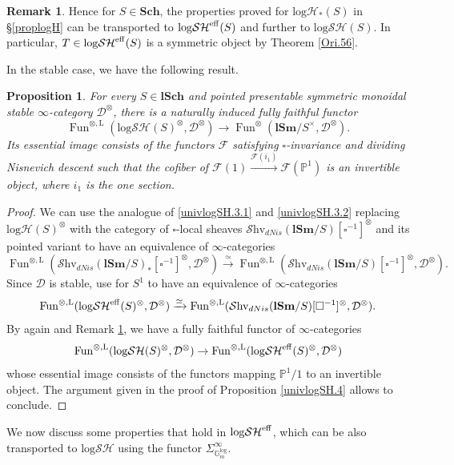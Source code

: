 \documentclass[11pt, a4paper]{amsart}
\newtheorem{prop}[thm]{Proposition}
\theoremstyle{definition}
\newtheorem{rmk}[thm]{Remark}
\numberwithin{equation}{subsection}
\renewcommand{\P}{\mathbb{P}}
\newcommand{\Sch}{\mathbf{Sch}}
\newcommand{\lSch}{\mathbf{lSch}}
\newcommand{\lSm}{\mathbf{lSm}}
\newcommand{\cD}{\mathcal{D}}
\newcommand{\cF}{\mathcal{F}}
\newcommand{\boxx}{\square}
\newcommand{\Gmm}{\mathbb{G}_m^{\mathrm{log}}}
\newcommand{\eff}{{\rm eff}}
\newcommand{\infShv}{\mathcal{S}\mathrm{hv}}
\newcommand{\Fun}{\operatorname{Fun}}
\newcommand{\infD}{\mathcal{D}}
\newcommand{\inflogH}{\mathrm{log}\mathcal{H}}
\newcommand{\inflogHpt}{\mathrm{log}\mathcal{H}_\ast}
\newcommand{\inflogSH}{\mathrm{log}\mathcal{SH}}
\begin{document}
\begin{rmk}
\label{Ori.74}
Hence for $S\in \Sch$,
the properties proved for $\inflogHpt(S)$ in \S \ref{proplogH} can be transported to $\inflogSH^\eff(S)$ and further to $\inflogSH(S)$. In particular, $T\in \inflogSH^\eff(S)$ is a symmetric object by Theorem \ref{Ori.56}.
\end{rmk}


In the stable case, we have the following result.
\begin{prop}
\label{univlogSH.5}
For every $S\in \lSch$ and pointed presentable symmetric monoidal stable $\infty$-category $\infD^\otimes$, 
there is a naturally induced fully faithful functor
\[
\Fun^{\otimes,\mathrm{L}}(\inflogSH(S)^\otimes,\infD^\otimes)
\to
\Fun^{\otimes}(\lSm/S^\times ,\infD^\otimes).
\]
Its essential image consists of the functors $\cF$ satisfying $\boxx$-invariance and dividing Nisnevich descent 
such that the cofiber of $\cF(1)\xrightarrow{\cF(i_1)} \cF(\P^1)$ is an invertible object,
where $i_1$ is the one section.
\end{prop}
\begin{proof}
We can use the analogue of \eqref{univlogSH.3.1} and \eqref{univlogSH.3.2} replacing $\inflogH(S)^{\otimes}$ with the category of $\boxx$-local sheaves $\infShv_{dNis}(\lSm/S)[\boxx^{-1}]^\otimes$ and its pointed variant to have an equivalence of $\infty$-categories
\[
\Fun^{\otimes,\mathrm{L}}(\infShv_{dNis}(\lSm/S)_\ast[\boxx^{-1}]^\otimes,\infD^\otimes)
\xrightarrow{\simeq}
\Fun^{\otimes,\mathrm{L}}(\infShv_{dNis}(\lSm/S)[\boxx^{-1}]^\otimes,\infD^\otimes).
\]
Since $\cD$ is stable,
use \cite[Proposition 2.9]{RobaloThesispublished} for $S^1$ to have an equivalence of $\infty$-categories
\[
\Fun^{\otimes,\mathrm{L}}(\inflogSH^\eff(S)^\otimes,\infD^\otimes)
\xrightarrow{\simeq}
\Fun^{\otimes,\mathrm{L}}(\infShv_{dNis}(\lSm/S)[\boxx^{-1}]^\otimes,\infD^\otimes).
\]
By \cite[Proposition 2.9]{RobaloThesispublished} again and Remark \ref{Ori.74}, 
we have a fully faithful functor of $\infty$-categories
\[
\Fun^{\otimes,\mathrm{L}}(\inflogSH(S)^\otimes,\infD^\otimes)
\to
\Fun^{\otimes,\mathrm{L}}(\inflogSH^\eff(S)^\otimes,\infD^\otimes)
\]
whose essential image consists of the functors mapping $\P^1/1$ to an invertible object.
The argument given in the proof of  Proposition \ref{univlogSH.4} allows to conclude.
\end{proof}

We now discuss some properties that hold in
$\inflogSH^\eff$,
which can be also transported to  $\inflogSH$ using the functor $\Sigma_{\Gmm}^\infty$.
\end{document}
